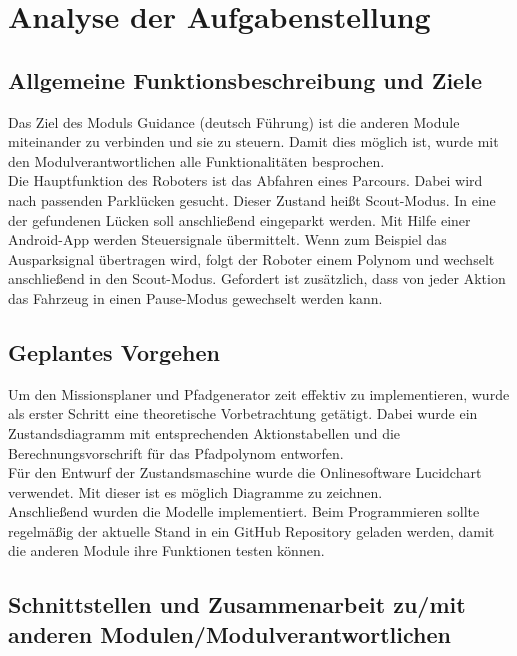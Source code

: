 \chapter{Analyse der Aufgabenstellung}


\section{Allgemeine Funktionsbeschreibung und Ziele}

Das Ziel des Moduls Guidance (deutsch Führung) ist die anderen Module miteinander zu verbinden und sie zu steuern. 
Damit dies möglich ist, wurde mit den Modulverantwortlichen alle Funktionalitäten besprochen. \\

\noindent Die Hauptfunktion des Roboters ist das Abfahren eines Parcours. Dabei wird nach passenden Parklücken gesucht. Dieser Zustand heißt Scout-Modus.
In eine der gefundenen Lücken soll anschließend eingeparkt werden. Mit Hilfe einer Android-App werden Steuersignale übermittelt. Wenn zum Beispiel das Ausparksignal übertragen wird, folgt der Roboter einem Polynom und wechselt anschließend in den Scout-Modus. Gefordert ist zusätzlich, dass von jeder Aktion das Fahrzeug in einen Pause-Modus gewechselt werden kann.

\section{Geplantes Vorgehen}

Um den Missionsplaner und Pfadgenerator zeit effektiv zu implementieren, wurde als erster Schritt eine theoretische Vorbetrachtung getätigt. Dabei wurde ein Zustandsdiagramm mit entsprechenden Aktionstabellen und die Berechnungsvorschrift für das Pfadpolynom entworfen. \\
\noindent Für den Entwurf der Zustandsmaschine wurde die Onlinesoftware Lucidchart verwendet. Mit dieser ist es möglich Diagramme zu zeichnen. \\

\noindent Anschließend wurden die Modelle implementiert. Beim Programmieren sollte regelmäßig der aktuelle Stand in ein \glqq GitHub Repository\grqq{} geladen werden, damit die anderen Module ihre Funktionen testen können.

\section{Schnittstellen und Zusammenarbeit zu/mit anderen Modulen/Modulverantwortlichen}

